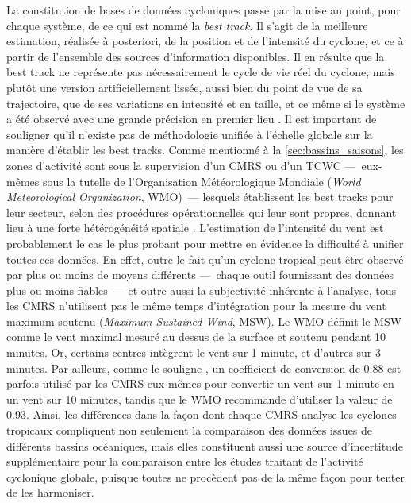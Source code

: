 \documentclass[../main.tex]{subfiles}
\begin{document}
La constitution de bases de données cycloniques passe par la mise au point, pour chaque système, de ce qui est nommé la \textit{best track}. Il s'agit de la
meilleure estimation, réalisée à posteriori, de la position et de l'intensité du cyclone, et ce à partir de l'ensemble des sources d'information disponibles. Il
en résulte que la best track ne représente pas nécessairement le cycle de vie réel du cyclone, mais plutôt une version artificiellement lissée, aussi bien du
point de vue de sa trajectoire, que de ses variations en intensité et en taille, et ce même si le système a été observé avec une grande précision en premier
lieu \parencite{landsea_atlantic_2013}. Il est important de souligner qu'il n'existe pas de méthodologie unifiée à l'échelle globale sur la manière d'établir
les best tracks. Comme mentionné à la \cref{sec:bassins_saisons}, les zones d'activité sont sous la supervision d'un CMRS ou d'un TCWC ---~eux-mêmes sous la
tutelle de l'Organisation Météorologique Mondiale (\textit{World Meteorological Organization}, WMO)~--- lesquels établissent les best tracks pour leur secteur,
selon des procédures opérationnelles qui leur sont propres, donnant lieu à une forte hétérogénéité spatiale \parencite{schreck_impact_2014}. L'estimation de
l'intensité du vent est probablement le cas le plus probant pour mettre en évidence la difficulté à unifier toutes ces données. En effet, outre le fait qu'un
cyclone tropical peut être observé par plus ou moins de moyens différents ---~chaque outil fournissant des données plus ou moins fiables~--- et outre aussi la
subjectivité inhérente à l'analyse, tous les CMRS n'utilisent pas le même temps d'intégration pour la mesure du vent maximum soutenu (\textit{Maximum Sustained
Wind}, MSW). Le WMO définit le MSW comme le vent maximal mesuré  au dessus de la surface et soutenu pendant \num{10} minutes. Or, certains centres
intègrent le vent sur \num{1} minute, et d'autres sur \num{3} minutes. Par ailleurs, comme le souligne \cite{knapp_international_2010}, un coefficient de
conversion de \num{0.88} est parfois utilisé par les CMRS eux-mêmes pour convertir un vent sur \num{1} minute en un vent sur \num{10} minutes, tandis que le WMO
recommande d'utiliser la valeur de \num{0.93}. Ainsi, les différences dans la façon dont chaque CMRS analyse les cyclones tropicaux compliquent non seulement la
comparaison des données issues de différents bassins océaniques, mais elles constituent aussi une source d'incertitude supplémentaire pour la comparaison entre
les études traitant de l'activité cyclonique globale, puisque toutes ne procèdent pas de la même façon pour tenter de les harmoniser.
\end{document}
